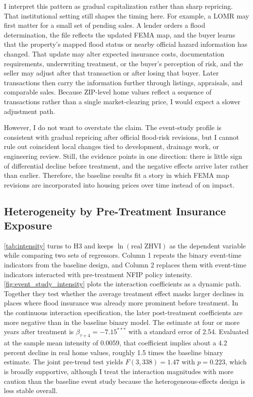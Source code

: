 \documentclass[12pt]{article}
\begin{document}
I interpret this pattern as gradual capitalization rather than sharp repricing. That institutional setting still shapes the timing here. For example, a LOMR may first matter for a small set of pending sales. A lender orders a flood determination, the file reflects the updated FEMA map, and the buyer learns that the property's mapped flood status or nearby official hazard information has changed. That update may alter expected insurance costs, documentation requirements, underwriting treatment, or the buyer's perception of risk, and the seller may adjust after that transaction or after losing that buyer. Later transactions then carry the information further through listings, appraisals, and comparable sales. Because ZIP-level home values reflect a sequence of transactions rather than a single market-clearing price, I would expect a slower adjustment path.

However, I do not want to overstate the claim. The event-study profile is consistent with gradual repricing after official flood-risk revisions, but I cannot rule out coincident local changes tied to development, drainage work, or engineering review. Still, the evidence points in one direction: there is little sign of differential decline before treatment, and the negative effects arrive later rather than earlier. Therefore, the baseline results fit a story in which FEMA map revisions are incorporated into housing prices over time instead of on impact.
\FloatBarrier


\subsection{Heterogeneity by Pre-Treatment Insurance Exposure}\label{sec:intensity}

\autoref{tab:intensity} turns to H3 and keeps $\ln(\text{real ZHVI})$ as the dependent variable while comparing two sets of regressors. Column 1 repeats the binary event-time indicators from the baseline design, and Column 2 replaces them with event-time indicators interacted with pre-treatment NFIP policy intensity. \autoref{fig:event_study_intensity} plots the interaction coefficients as a dynamic path. Together they test whether the average treatment effect masks larger declines in places where flood insurance was already more prominent before treatment. In the continuous interaction specification, the later post-treatment coefficients are more negative than in the baseline binary model. The estimate at four or more years after treatment is $\hat{\beta}_{\tau+4} = -7.15^{***}$ with a standard error of 2.54. Evaluated at the sample mean intensity of 0.0059, that coefficient implies about a 4.2 percent decline in real home values, roughly 1.5 times the baseline binary estimate. The joint pre-trend test yields $F(3,338) = 1.47$ with $p = 0.223$, which is broadly supportive, although I treat the interaction magnitudes with more caution than the baseline event study because the heterogeneous-effects design is less stable overall.
\end{document}
